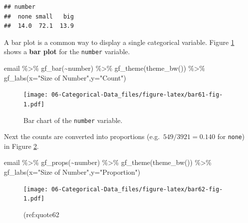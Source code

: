 \documentclass[
]{book}
\newenvironment{Shaded}{\begin{snugshade}}{\end{snugshade}}
\newcommand{\AttributeTok}[1]{\textcolor[rgb]{0.77,0.63,0.00}{#1}}
\newcommand{\FunctionTok}[1]{\textcolor[rgb]{0.00,0.00,0.00}{#1}}
\newcommand{\NormalTok}[1]{#1}
\newcommand{\SpecialCharTok}[1]{\textcolor[rgb]{0.00,0.00,0.00}{#1}}
\newcommand{\StringTok}[1]{\textcolor[rgb]{0.31,0.60,0.02}{#1}}
\begin{document}
\begin{verbatim}
## number
##  none small   big 
##  14.0  72.1  13.9
\end{verbatim}

A bar plot is a common way to display a single categorical variable. Figure \ref{fig:bar61-fig} shows a \textbf{bar plot} for the \texttt{number} variable.



\begin{Shaded}
\begin{Highlighting}[]
\NormalTok{email }\SpecialCharTok{\%\textgreater{}\%}
  \FunctionTok{gf\_bar}\NormalTok{(}\SpecialCharTok{\textasciitilde{}}\NormalTok{number) }\SpecialCharTok{\%\textgreater{}\%}
  \FunctionTok{gf\_theme}\NormalTok{(}\FunctionTok{theme\_bw}\NormalTok{()) }\SpecialCharTok{\%\textgreater{}\%}
  \FunctionTok{gf\_labs}\NormalTok{(}\AttributeTok{x=}\StringTok{"Size of Number"}\NormalTok{,}\AttributeTok{y=}\StringTok{"Count"}\NormalTok{)}
\end{Highlighting}
\end{Shaded}

\begin{figure}
\centering
\texttt{[image: 06-Categorical-Data\_files/figure-latex/bar61-fig-1.pdf]}
\caption{\label{fig:bar61-fig}Bar chart of the \texttt{number} variable.}
\end{figure}

Next the counts are converted into proportions (e.g.~\(549/3921=0.140\) for \texttt{none}) in Figure \ref{fig:bar62-fig}.



\begin{Shaded}
\begin{Highlighting}[]
\NormalTok{email }\SpecialCharTok{\%\textgreater{}\%}
  \FunctionTok{gf\_props}\NormalTok{(}\SpecialCharTok{\textasciitilde{}}\NormalTok{number) }\SpecialCharTok{\%\textgreater{}\%}
  \FunctionTok{gf\_theme}\NormalTok{(}\FunctionTok{theme\_bw}\NormalTok{()) }\SpecialCharTok{\%\textgreater{}\%}
  \FunctionTok{gf\_labs}\NormalTok{(}\AttributeTok{x=}\StringTok{"Size of Number"}\NormalTok{,}\AttributeTok{y=}\StringTok{"Proportion"}\NormalTok{)}
\end{Highlighting}
\end{Shaded}

\begin{figure}
\centering
\texttt{[image: 06-Categorical-Data\_files/figure-latex/bar62-fig-1.pdf]}
\caption{\label{fig:bar62-fig}(ref:quote62}
\end{figure}
\end{document}
